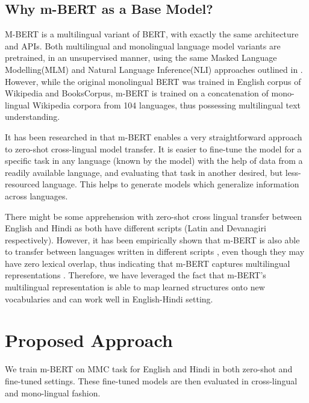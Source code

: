 \documentclass[acmsmall]{acmart}
\begin{document}
\subsection{Why m-BERT as a Base Model?}

\par M-BERT is a multilingual variant of BERT, with exactly the same architecture and APIs. Both multilingual and monolingual language model variants are pretrained, in an unsupervised manner, using the same Masked Language Modelling(MLM) and Natural Language Inference(NLI) approaches outlined in \cite{bert}. However, while the original monolingual BERT was trained in English corpus of Wikipedia and BooksCorpus, m-BERT is trained on a concatenation of mono-lingual Wikipedia corpora from 104 languages, thus possessing multilingual text understanding.
\par It has been researched in \citep{bert-multilingual} that m-BERT  enables a very straightforward approach to zero-shot cross-lingual model transfer. It is easier to fine-tune the model for a specific task in any language (known by the model) with the help of data from a readily available language, and evaluating that task in another desired, but less-resourced language. This helps to generate models which generalize information across languages. 
\par There might be some apprehension with zero-shot cross lingual transfer between English and Hindi as both have different scripts (Latin and Devanagiri respectively). However, it has been empirically shown that m-BERT is also able to transfer between languages written in different scripts \cite{multilingualQA}, even though they may have zero lexical overlap, thus indicating that m-BERT captures multilingual representations \cite{cross-lingual-effective-mbert}. Therefore, we have leveraged the fact that m-BERT’s multilingual representation is able to map learned structures onto new vocabularies and can work well in English-Hindi setting. 

\section{Proposed Approach}
\label{proposed_approach}
\par We train m-BERT on MMC task for English and Hindi in both zero-shot and fine-tuned settings. These fine-tuned models are then evaluated in cross-lingual and mono-lingual fashion.  
\end{document}
